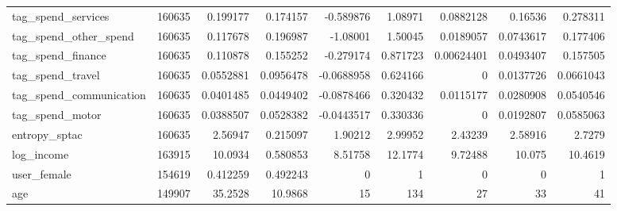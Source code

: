 \begin{tabular}{lrrrrrrrr}
 tag\_spend\_services      &  160635 &    0.199177   &    0.174157  &     -0.589876   &      1.08971  &    0.0882128  &   0.16536    &    0.278311  \\
 tag\_spend\_other\_spend   &  160635 &    0.117678   &    0.196987  &     -1.08001    &      1.50045  &    0.0189057  &   0.0743617  &    0.177406  \\
 tag\_spend\_finance       &  160635 &    0.110878   &    0.155252  &     -0.279174   &      0.871723 &    0.00624401 &   0.0493407  &    0.157505  \\
 tag\_spend\_travel        &  160635 &    0.0552881  &    0.0956478 &     -0.0688958  &      0.624166 &    0          &   0.0137726  &    0.0661043 \\
 tag\_spend\_communication &  160635 &    0.0401485  &    0.0449402 &     -0.0878466  &      0.320432 &    0.0115177  &   0.0280908  &    0.0540546 \\
 tag\_spend\_motor         &  160635 &    0.0388507  &    0.0528382 &     -0.0443517  &      0.330336 &    0          &   0.0192807  &    0.0585063 \\
 entropy\_sptac           &  160635 &    2.56947    &    0.215097  &      1.90212    &      2.99952  &    2.43239    &   2.58916    &    2.7279    \\
 log\_income              &  163915 &   10.0934     &    0.580853  &      8.51758    &     12.1774   &    9.72488    &  10.075      &   10.4619    \\
 user\_female             &  154619 &    0.412259   &    0.492243  &      0          &      1        &    0          &   0          &    1         \\
 age                     &  149907 &   35.2528     &   10.9868    &     15          &    134        &   27          &  33          &   41         \\
\bottomrule
\end{tabular}
